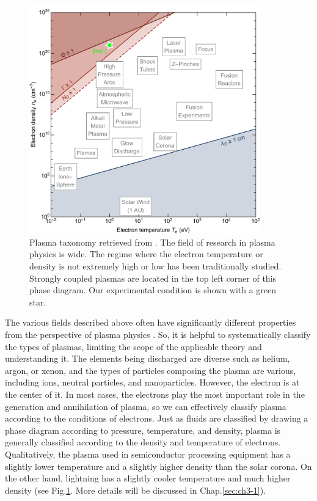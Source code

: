 \begin{figure}[ht!]
\centering
\includegraphics[width=100mm]{figures/ch1/taxonomy/taxonomy.pdf}
\caption{Plasma taxonomy retrieved from \cite{huba1998nrl}. The field of research in plasma physics is wide. The regime where the electron temperature or density is not extremely high or low has been traditionally studied. Strongly coupled plasmas are located in the top left corner of this phase diagram. Our experimental condition is shown with a green star.}
\label{fig:taxonomy}
\end{figure}

The various fields described above often have significantly different properties from the perspective of plasma physics \cite{huba1998nrl, bellan2008fundamentals}. So, it is helpful to systematically classify the types of plasmas, limiting the scope of the applicable theory and understanding it. The elements being discharged are diverse such as helium, argon, or xenon, and the types of particles composing the plasma are various, including ions, neutral particles, and nanoparticles. However, the electron is at the center of it. In most cases, the electrons play the most important role in the generation and annihilation of plasma, so we can effectively classify plasma according to the conditions of electrons. Just as fluids are classified by drawing a phase diagram according to pressure, temperature, and density, plasma is generally classified according to the density and temperature of electrons. Qualitatively, the plasma used in semiconductor processing equipment has a slightly lower temperature and a slightly higher density than the solar corona. On the other hand, lightning has a slightly cooler temperature and much higher density (see Fig.\ref{fig:taxonomy}. More details will be discussed in Chap.\ref{sec:ch3-1}).

